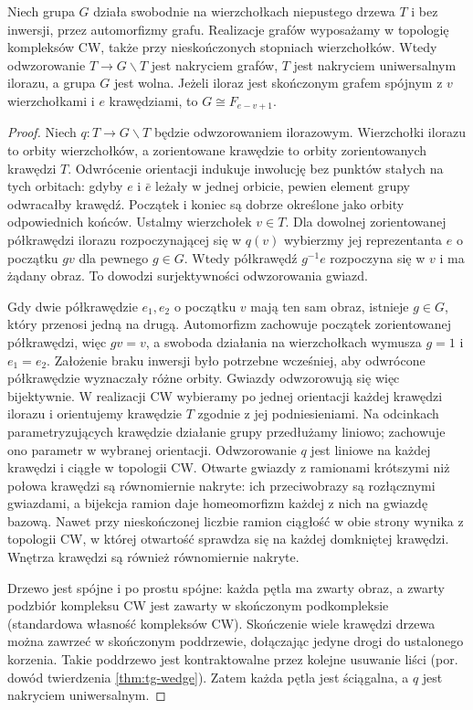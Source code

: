 \begin{stwierdzenie}
Niech grupa $G$ działa swobodnie na wierzchołkach
niepustego drzewa $T$ i bez inwersji, przez automorfizmy grafu.
Realizacje grafów wyposażamy w topologię kompleksów CW,
także przy nieskończonych stopniach wierzchołków. Wtedy odwzorowanie
$T\to G\backslash T$ jest nakryciem grafów, $T$ jest
nakryciem uniwersalnym ilorazu, a grupa $G$ jest wolna.
Jeżeli iloraz jest skończonym grafem spójnym z $v$
wierzchołkami i $e$ krawędziami, to $G\cong F_{e-v+1}$.
\end{stwierdzenie}
\begin{proof}
Niech $q:T\to G\backslash T$ będzie odwzorowaniem
ilorazowym. Wierzchołki ilorazu to orbity wierzchołków,
a zorientowane krawędzie to orbity zorientowanych
krawędzi $T$. Odwrócenie orientacji indukuje
inwolucję bez punktów stałych na tych orbitach:
gdyby $e$ i $\bar e$ leżały w jednej orbicie,
pewien element grupy odwracałby krawędź.
Początek i koniec są dobrze określone jako orbity
odpowiednich końców. Ustalmy wierzchołek $v\in T$.
Dla dowolnej zorientowanej półkrawędzi ilorazu
rozpoczynającej się w $q(v)$ wybierzmy jej
reprezentanta $e$ o początku $gv$ dla pewnego
$g\in G$. Wtedy półkrawędź $g^{-1}e$
rozpoczyna się w $v$ i ma żądany obraz.
To dowodzi surjektywności odwzorowania gwiazd.

Gdy dwie półkrawędzie $e_1,e_2$ o początku $v$
mają ten sam obraz, istnieje $g\in G$,
który przenosi jedną na drugą. Automorfizm zachowuje początek zorientowanej
półkrawędzi, więc $gv=v$, a swoboda działania
na wierzchołkach wymusza $g=1$ i $e_1=e_2$.
Założenie braku inwersji było potrzebne wcześniej,
aby odwrócone półkrawędzie wyznaczały różne orbity.
Gwiazdy odwzorowują się więc bijektywnie.
W realizacji CW wybieramy po jednej orientacji
każdej krawędzi ilorazu i orientujemy krawędzie $T$
zgodnie z jej podniesieniami. Na odcinkach
parametryzujących krawędzie działanie grupy
przedłużamy liniowo; zachowuje ono parametr
w wybranej orientacji. Odwzorowanie $q$ jest
liniowe na każdej krawędzi i ciągłe w topologii CW.
Otwarte gwiazdy z ramionami krótszymi niż połowa
krawędzi są równomiernie nakryte: ich przeciwobrazy
są rozłącznymi gwiazdami, a bijekcja ramion daje
homeomorfizm każdej z nich na gwiazdę bazową.
Nawet przy nieskończonej liczbie ramion ciągłość
w obie strony wynika z topologii CW, w której
otwartość sprawdza się na każdej domkniętej krawędzi.
Wnętrza krawędzi są również równomiernie nakryte.

Drzewo jest spójne i po prostu spójne: każda pętla
ma zwarty obraz, a zwarty podzbiór kompleksu CW
jest zawarty w skończonym podkompleksie
(standardowa własność kompleksów CW).
Skończenie wiele krawędzi drzewa można zawrzeć
w skończonym poddrzewie, dołączając jedyne drogi
do ustalonego korzenia. Takie poddrzewo jest
kontraktowalne przez kolejne usuwanie liści
(por. dowód twierdzenia \ref{thm:tg-wedge}).
Zatem każda pętla jest ściągalna, a $q$ jest
nakryciem uniwersalnym.


\end{proof}
